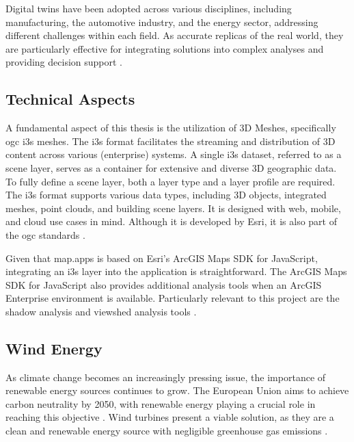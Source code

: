\documentclass[11pt, titlepage, a4paper]{scrartcl}
\begin{document}
\begin{linenumbers}
    Digital twins have been adopted across various disciplines, including manufacturing, the automotive industry, and the energy sector, addressing different challenges within each field. As accurate replicas of the real world, they are particularly effective for integrating solutions into complex analyses and providing decision support \cite{pylianidisIntroducingDigitalTwins2021}.

    \subsection{Technical Aspects}
    A fundamental aspect of this thesis is the utilization of 3D Meshes, specifically \gls{ogc} \gls{i3s} meshes. The \gls{i3s} format facilitates the streaming and distribution of 3D content across various (enterprise) systems. A single \gls{i3s} dataset, referred to as a scene layer, serves as a container for extensive and diverse 3D geographic data. To fully define a scene layer, both a layer type and a layer profile are required.
    The \gls{i3s} format supports various data types, including 3D objects, integrated meshes, point clouds, and building scene layers. It is designed with web, mobile, and cloud use cases in mind. Although it is developed by Esri, it is also part of the \gls{ogc} standards \cite{esriincI3sspec}.

    Given that map.apps is based on Esri's ArcGIS Maps SDK for JavaScript, integrating an \gls{i3s} layer into the application is straightforward. The ArcGIS Maps SDK for JavaScript also provides additional analysis tools when an ArcGIS Enterprise environment is available. Particularly relevant to this project are the shadow analysis \cite{esriincShadowCast} and viewshed analysis tools \cite{esriincGeoprocessingViewshedAnalysis}.

    \subsection{Wind Energy}
    As climate change becomes an increasingly pressing issue, the importance of renewable energy sources continues to grow. The European Union aims to achieve carbon neutrality by 2050, with renewable energy playing a crucial role in reaching this objective \cite{europeancommission.directorategeneralforclimateaction.GoingClimateneutral20502019}. Wind turbines present a viable solution, as they are a clean and renewable energy source with negligible greenhouse gas emissions \cite{pryorClimateChangeImpacts2020}.


\end{linenumbers}
\end{document}

